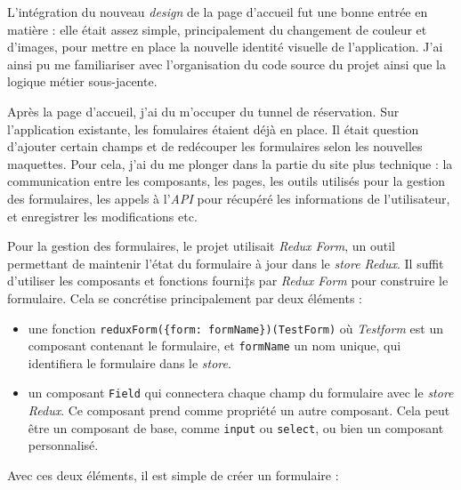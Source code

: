 \bigskip

L'intégration du nouveau \emph{design} de la page d'accueil fut une
bonne entrée en matière : elle était assez simple, principalement du
changement de couleur et d'images, pour mettre en place la nouvelle
identité visuelle de l'application. J'ai ainsi pu me familiariser avec
l'organisation du code source du projet ainsi que la logique métier
sous-jacente.

\bigskip

Après la page d'accueil, j'ai du m'occuper du tunnel de réservation. Sur
l'application existante, les fomulaires étaient déjà en place. Il était
question d'ajouter certain champs et de redécouper les formulaires selon
les nouvelles maquettes. Pour cela, j'ai du me plonger dans la partie du
site plus technique : la communication entre les composants, les pages,
les outils utilisés pour la gestion des formulaires, les appels à
l'\emph{API} pour récupéré les informations de l'utilisateur, et
enregistrer les modifications etc.

\bigskip

Pour la gestion des formulaires, le projet utilisait \emph{Redux Form},
un outil permettant de maintenir l'état du formulaire à jour dans le
\emph{store Redux}. Il suffit d'utiliser les composants et fonctions
fourni‡s par \emph{Redux Form} pour construire le formulaire. Cela se
concrétise principalement par deux éléments :

\begin{itemize}
\tightlist
\item
  une fonction
  \texttt{reduxForm(\{form:\ \textquotesingle{}formName\textquotesingle{}\})(TestForm)}
  où \emph{Testform} est un composant contenant le formulaire, et
  \texttt{formName} un nom unique, qui identifiera le formulaire dans le
  \emph{store}.
\item
  un composant \texttt{Field} qui connectera chaque champ du formulaire
  avec le \emph{store Redux}. Ce composant prend comme propriété un
  autre composant. Cela peut être un composant de base, comme
  \texttt{input} ou \texttt{select}, ou bien un composant personnalisé.
\end{itemize}

Avec ces deux éléments, il est simple de créer un formulaire :


